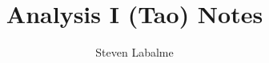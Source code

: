 \documentclass{report}
\title{Analysis I (Tao) Notes}
\author{Steven Labalme}
\begin{document}
\maketitle



\tableofcontents
\thispagestyle{plain}
\newpage




\pagestyle{fancy}
\renewcommand{\chaptermark}[1]{\markboth{Chapter \thechapter: #1}{}}
\fancyhf{}
\lhead{\leftmark}





\begin{appendices}
    
\end{appendices}
\end{document}
